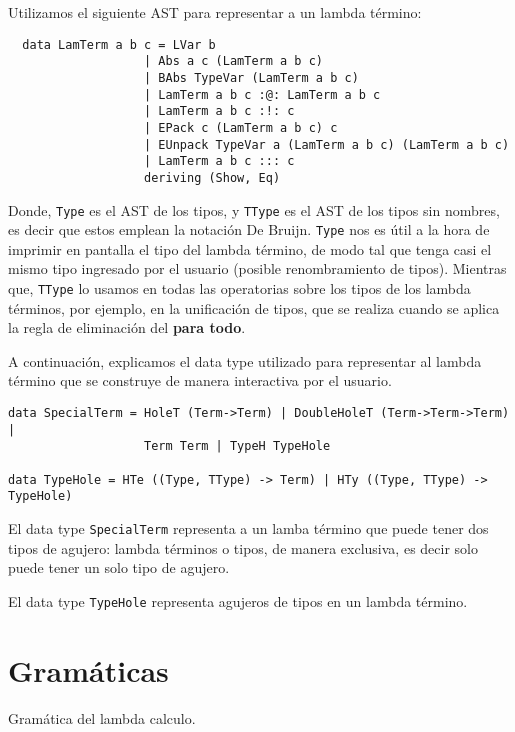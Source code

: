 \documentclass[a4paper,11pt]{article}
\theoremstyle{definition}
\begin{document}
Utilizamos el siguiente AST para representar a un lambda término:
\begin{verbatim}
  data LamTerm a b c = LVar b
                   | Abs a c (LamTerm a b c)
                   | BAbs TypeVar (LamTerm a b c)
                   | LamTerm a b c :@: LamTerm a b c
                   | LamTerm a b c :!: c
                   | EPack c (LamTerm a b c) c
                   | EUnpack TypeVar a (LamTerm a b c) (LamTerm a b c)
                   | LamTerm a b c ::: c
                   deriving (Show, Eq)
\end{verbatim}
  
Donde, \texttt{Type} es el AST de los tipos, y \texttt{TType} es el AST de los tipos sin nombres, es decir que estos emplean la notación De Bruijn.
\texttt{Type} nos es útil a la hora de imprimir en pantalla el tipo del lambda término, de modo tal que tenga casi el mismo tipo ingresado por el usuario 
(posible renombramiento de tipos).
Mientras que, \texttt{TType} lo usamos en todas las operatorias sobre los tipos de los lambda términos, por ejemplo, en la unificación de tipos, que
se realiza cuando se aplica la regla de eliminación del \textbf{para todo}.

A continuación, explicamos el data type utilizado para representar al lambda término que se construye de manera interactiva por el usuario.

\begin{verbatim}
data SpecialTerm = HoleT (Term->Term) | DoubleHoleT (Term->Term->Term) |
                   Term Term | TypeH TypeHole

data TypeHole = HTe ((Type, TType) -> Term) | HTy ((Type, TType) -> TypeHole)
\end{verbatim}

El data type \texttt{SpecialTerm} representa a un lamba término que puede tener dos tipos de agujero: lambda términos o tipos, de manera
exclusiva, es decir solo puede tener un solo tipo de agujero.

El data type \texttt{TypeHole} representa agujeros de tipos en un lambda término.

\section{Gramáticas}
 Gramática del lambda calculo.
\end{document}
